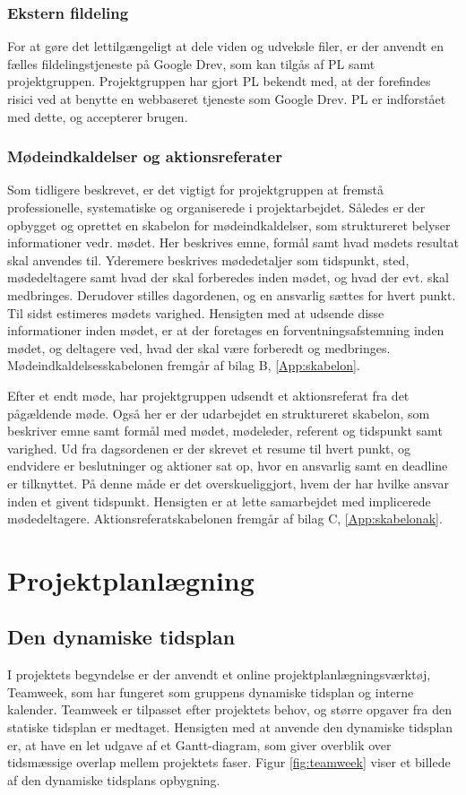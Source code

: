 	\subsubsection{Ekstern fildeling}
	For at gøre det lettilgængeligt at dele viden og udveksle filer, er der anvendt en fælles fildelingstjeneste på Google Drev, som kan tilgås af PL samt projektgruppen.  
	Projektgruppen har gjort PL bekendt med, at der forefindes risici ved at benytte en webbaseret tjeneste som Google Drev. PL er indforstået med dette, og accepterer brugen.
	 
	\subsubsection{Mødeindkaldelser og aktionsreferater}
	Som tidligere beskrevet, er det vigtigt for projektgruppen at fremstå professionelle, systematiske og organiserede i projektarbejdet. Således er der opbygget og oprettet en skabelon for mødeindkaldelser, som struktureret belyser informationer vedr. mødet. Her beskrives emne, formål samt hvad mødets resultat skal anvendes til. Yderemere beskrives mødedetaljer som tidspunkt, sted, mødedeltagere samt hvad der skal forberedes inden mødet, og hvad der evt. skal medbringes. Derudover stilles dagordenen, og en ansvarlig sættes for hvert punkt. Til sidst estimeres mødets varighed. Hensigten med at udsende disse informationer inden mødet, er at der foretages en forventningsafstemning inden mødet, og deltagere ved, hvad der skal være forberedt og medbringes. Mødeindkaldelsesskabelonen fremgår af bilag B, \ref{App:skabelon}.  
	
	Efter et endt møde, har projektgruppen udsendt et aktionsreferat fra det pågældende møde. Også her er der udarbejdet en struktureret skabelon, som beskriver emne samt formål med mødet, mødeleder, referent og tidspunkt samt varighed. Ud fra dagsordenen er der skrevet et resume til hvert punkt, og endvidere er beslutninger og aktioner sat op, hvor en ansvarlig samt en deadline er tilknyttet. På denne måde er det overskueliggjort, hvem der har hvilke ansvar inden et givent tidspunkt. Hensigten er at lette samarbejdet med implicerede mødedeltagere. Aktionsreferatskabelonen fremgår af bilag C, \ref{App:skabelonak}.        
	
\section{Projektplanlægning}  
\subsection{Den dynamiske tidsplan} 
I projektets begyndelse er der anvendt et online projektplanlægningsværktøj, Teamweek, som har fungeret som gruppens dynamiske tidsplan og interne kalender. Teamweek er tilpasset efter projektets behov, og større opgaver fra den statiske tidsplan er medtaget. Hensigten med at anvende den dynamiske tidsplan er, at have en let udgave af et Gantt-diagram, som giver overblik over tidsmæssige overlap mellem projektets faser. Figur \ref{fig:teamweek} viser et billede af den dynamiske tidsplans opbygning.  

